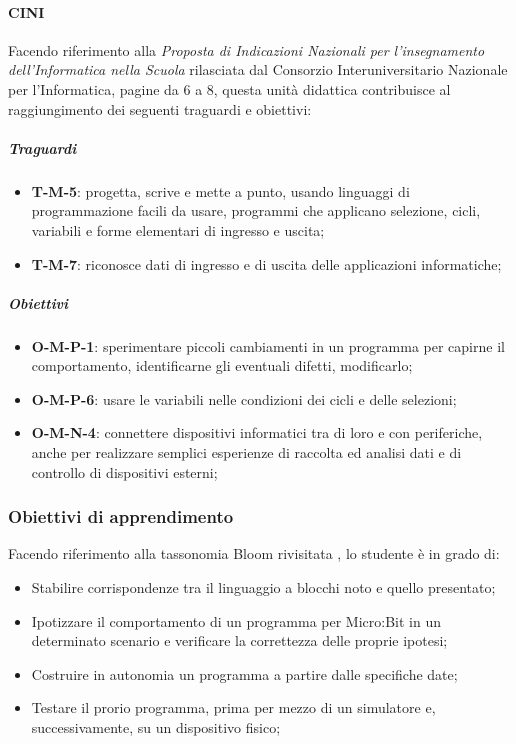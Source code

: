 \documentclass[../../relazione.tex]{subfiles}
\begin{document}
\paragraph{CINI}
Facendo riferimento alla \textit{Proposta di Indicazioni Nazionali per l'insegnamento dell'Informatica nella Scuola} \cite{CINI} rilasciata dal Consorzio Interuniversitario Nazionale per l'Informatica, pagine da 6 a 8, questa unità didattica contribuisce al raggiungimento dei seguenti traguardi e obiettivi:
\subparagraph{Traguardi}
\begin{itemize}
	\item \textbf{T-M-5}: progetta, scrive e mette a punto, usando linguaggi di programmazione facili da usare, programmi che applicano selezione, cicli, variabili e forme elementari di ingresso e uscita;
	\item \textbf{T-M-7}: riconosce dati di ingresso e di uscita delle applicazioni informatiche;
\end{itemize}
\subparagraph{Obiettivi}
\begin{itemize}
	\item \textbf{O-M-P-1}: sperimentare piccoli cambiamenti in un programma per capirne il comportamento, identificarne gli eventuali difetti, modificarlo;
	\item \textbf{O-M-P-6}: usare le variabili nelle condizioni dei cicli e delle selezioni;
	\item \textbf{O-M-N-4}: connettere dispositivi informatici tra di loro e con periferiche, anche per realizzare semplici esperienze di raccolta ed analisi dati e di controllo di dispositivi esterni;
\end{itemize}

\subsubsection{Obiettivi di apprendimento}
Facendo riferimento alla tassonomia Bloom rivisitata \cite{BLOOM}, lo studente è in grado di:
\begin{itemize}
	\item Stabilire corrispondenze tra il linguaggio a blocchi noto e quello presentato;
	\item Ipotizzare il comportamento di un programma per Micro:Bit in un determinato scenario e verificare la correttezza delle proprie ipotesi;
	\item Costruire in autonomia un programma a partire dalle specifiche date;
	\item Testare il prorio programma, prima per mezzo di un simulatore e, successivamente, su un dispositivo fisico;
\end{itemize}
\end{document}
